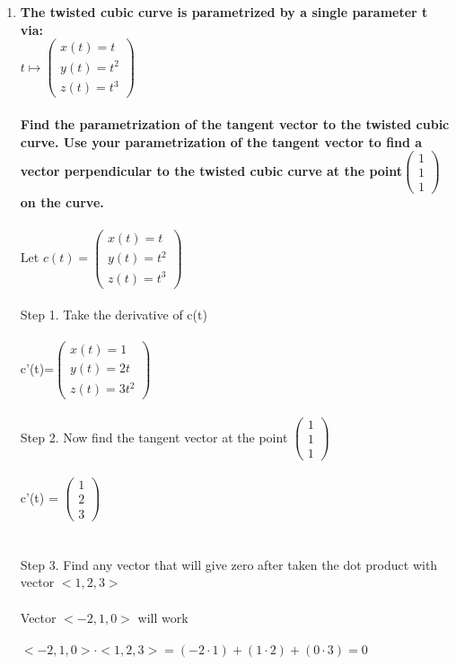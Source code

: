 \documentclass{article}
\begin{document}
\begin{enumerate}[6.]
\item\textbf{The twisted cubic curve is parametrized by a single parameter t via:\\$t\mapsto\left(\!\begin{array}{c}x(t) = t \\ y(t)=t^{2} \\  z(t)=t^{3}\end{array} \!\right)$\\\\Find the parametrization of the tangent vector to the twisted cubic curve. Use your parametrization of the tangent vector to find a vector perpendicular to the twisted cubic curve at the point$\left(\!\begin{array}{c}1 \\ 1 \\  1\end{array} \!\right)$ on the curve.}
\\
\\
Let $c(t)=\left(\!\begin{array}{c}x(t) = t \\ y(t)=t^{2} \\  z(t)=t^{3}\end{array} \!\right)$
\\
\\
Step 1. Take the derivative of c(t)\\
\\
c'(t)=$\left(\!\begin{array}{c}x(t) = 1 \\ y(t)= 2t \\  z(t)=3t^{2}\end{array} \!\right)$\\
\\
Step 2. Now find the tangent vector at the point $\left(\!\begin{array}{c}1 \\ 1 \\  1\end{array} \!\right)$\\
\\
c'(t) = $\left(\!\begin{array}{c} 1 \\ 2 \\  3\end{array} \!\right)$\\
\\
\\
Step 3. Find any vector that will give zero after taken the dot product with vector $<1,2,3>$\\
\\
Vector $<-2,1,0>$ will work \\
\\
$<-2,1,0>\cdot<1,2,3>=(-2\cdot1)+(1\cdot2)+(0\cdot3)=0$ 
\end{enumerate}
\end{document}
